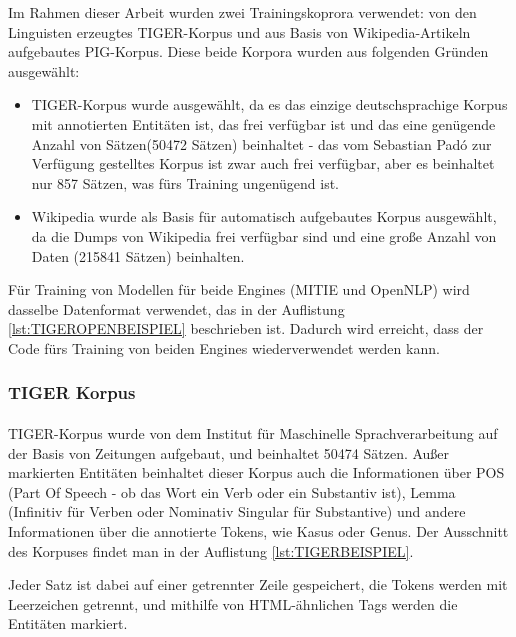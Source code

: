 Im Rahmen dieser Arbeit wurden zwei Trainingskoprora verwendet: von den Linguisten erzeugtes TIGER-Korpus und aus Basis von Wikipedia-Artikeln aufgebautes PIG-Korpus. Diese beide Korpora wurden aus folgenden Gründen ausgewählt:
\begin{itemize}
\item TIGER-Korpus wurde ausgewählt, da es das einzige deutschsprachige Korpus mit annotierten Entitäten ist, das frei verfügbar ist und das eine genügende Anzahl von Sätzen(50472 Sätzen) beinhaltet - das vom Sebastian Padó\cite{faruqui10:_training} zur Verfügung gestelltes Korpus ist zwar auch frei verfügbar, aber es beinhaltet nur 857 Sätzen, was fürs Training ungenügend ist.
\item Wikipedia wurde als Basis für automatisch aufgebautes Korpus ausgewählt, da die Dumps von Wikipedia frei verfügbar sind und eine große Anzahl von Daten (215841 Sätzen) beinhalten.
\end{itemize}

Für Training von Modellen für beide Engines (MITIE und OpenNLP) wird dasselbe Datenformat verwendet, das in der Auflistung \ref{lst:TIGEROPENBEISPIEL} beschrieben ist. Dadurch wird erreicht, dass der Code fürs Training von beiden Engines wiederverwendet werden kann.



\subsubsection{TIGER Korpus}
\paragraph{}
TIGER-Korpus wurde von dem Institut für Maschinelle Sprachverarbeitung\cite{brants2004tiger} auf der Basis von Zeitungen aufgebaut, und beinhaltet 50474 Sätzen. Außer markierten Entitäten beinhaltet dieser Korpus auch die Informationen über POS (Part Of Speech - ob das Wort ein Verb oder ein Substantiv ist), Lemma (Infinitiv für Verben oder Nominativ Singular für Substantive) und andere Informationen über die annotierte Tokens, wie Kasus oder Genus. Der Ausschnitt des Korpuses findet man in der Auflistung \ref{lst:TIGERBEISPIEL}.


Jeder Satz ist dabei auf einer getrennter Zeile gespeichert, die Tokens werden mit Leerzeichen getrennt, und mithilfe von HTML-ähnlichen Tags werden die Entitäten markiert.

